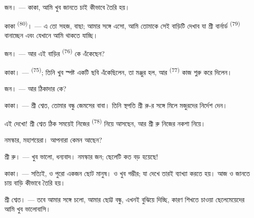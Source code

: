 %
%

\VUsaut{6.0mm}
\VUsaut{1.4mm}
\VUsaut{2.2mm}

\VUsaut{3.0mm}

\textsc{জন}। --- কাকা, আমি খুব জানতে চাই  কীভাবে তৈরি হয়।

\textsc{কাকা} \textsuperscript{(80)}। --- এ তো সহজ, বাছা; আমার সঙ্গে এসো, আমি
তোমাকে সেই বাড়িটি দেখাব যা শ্রী বার্নার্ড \textsuperscript{(79)} বানাচ্ছেন
এবং যেখানে আমি থাকতে যাচ্ছি।

\textsc{জন}। --- আর এই বাড়ির  \textsuperscript{(76)} কে
এঁকেছেন?

\textsc{কাকা}। ---  \textsuperscript{(75)}; তিনি খুব স্পষ্ট
একটি ছবি এঁকেছিলেন, তা মঞ্জুর হল, আর  \textsuperscript{(77)}
কাজ শুরু করে দিলেন।

\textsc{জন}। --- আর ঠিকাদার কে?

\textsc{কাকা}। --- শ্রী শ্বেত, তোমার বন্ধু জেমসের বাবা। তিনি স্থপতি শ্রী রু-র
সঙ্গে মিলে মজুরদের নির্দেশ দেন।

এই দেখো! শ্রী শ্বেত ঠিক সময়েই নিজের  \textsuperscript{(78)}
নিয়ে আসছেন, আর শ্রী রু নিজের নকশা নিয়ে।

নমস্কার, মহাশয়েরা। আপনারা কেমন আছেন?

\textsc{শ্রী রু}। --- খুব ভালো, ধন্যবাদ। নমস্কার জন; ছেলেটি কত বড় হয়েছে!

\textsc{কাকা}। --- সত্যিই, ও পুরো একজন ছোট মানুষ। ও খুব গম্ভীর; যা দেখে তারই
ব্যাখ্যা করতে হয়। আজ ও জানতে চায় বাড়ি কীভাবে তৈরি হয়।

\VUsaut{3.0mm}

\textsc{শ্রী শ্বেত}। --- তবে আমার সঙ্গে চলো, আমার ছোট্ট বন্ধু, এখনই বুঝিয়ে
দিচ্ছি, কারণ শিখতে চাওয়া ছেলেমেয়েদের আমি খুব ভালোবাসি।

